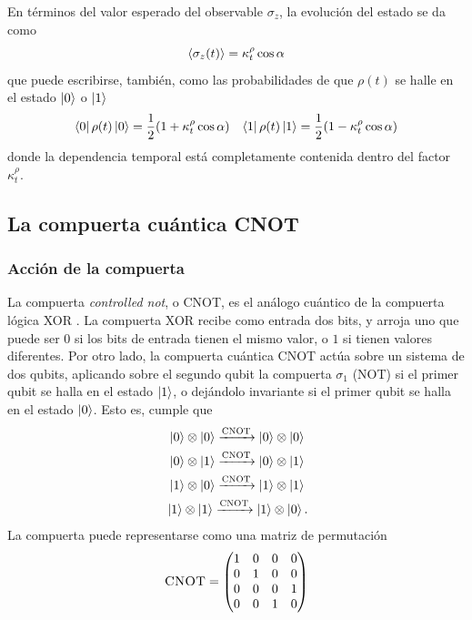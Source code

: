 En términos del valor esperado del observable $\sigma_{z}$, la evolución del estado se da como
\begin{equation}
  \expval{\sigma_{z}(t)}=\kappa_{t}^{\rho}\cos{\alpha}
\end{equation}
que puede escribirse, también, como las probabilidades de que $\rho(t)$ se halle en el estado $\ket{0}$ o $\ket{1}$
 \begin{align}
  \bra{0}\rho(t)\ket{0}=\frac{1}{2}(1+\kappa_{t}^{\rho}\cos{\alpha}) && \bra{1}\rho(t)\ket{1}=\frac{1}{2}(1-\kappa_{t}^{\rho}\cos{\alpha})
 \end{align}
 donde la dependencia temporal está completamente contenida dentro del factor $\kappa_{t}^{\rho}$. 

\subsection{La compuerta cuántica CNOT}

\subsubsection{Acción de la compuerta}

La compuerta \textit{controlled not}, o CNOT, es el análogo cuántico de la compuerta lógica XOR . La compuerta XOR recibe como entrada dos bits, y arroja uno que puede ser $0$ si los bits de entrada tienen el mismo valor, o $1$ si tienen valores diferentes. Por otro lado, la compuerta cuántica CNOT actúa sobre un sistema de dos qubits, aplicando sobre el segundo qubit la compuerta $\sigma_{1}$ (NOT) si el primer qubit se halla en el estado $\ket{1}$, o dejándolo invariante si el primer qubit se halla en el estado $\ket{0}$. Esto es, cumple que 
\begin{align*}
    \ket{0}\otimes\ket{0}\xrightarrow{\CNOT}\ket{0}\otimes\ket{0}\\
    \ket{0}\otimes\ket{1}\xrightarrow{\CNOT}\ket{0}\otimes\ket{1}\\
    \ket{1}\otimes\ket{0}\xrightarrow{\CNOT}\ket{1}\otimes\ket{1}\\
    \ket{1}\otimes\ket{1}\xrightarrow{\CNOT}\ket{1}\otimes\ket{0} \rlap{.}
\end{align*}
La compuerta puede representarse como una matriz de permutación
\begin{equation*}
    \textsc{CNOT}=\begin{pmatrix}
        1&0&0&0\\
        0&1&0&0\\
        0&0&0&1\\
        0&0&1&0
    \end{pmatrix}
\end{equation*}
